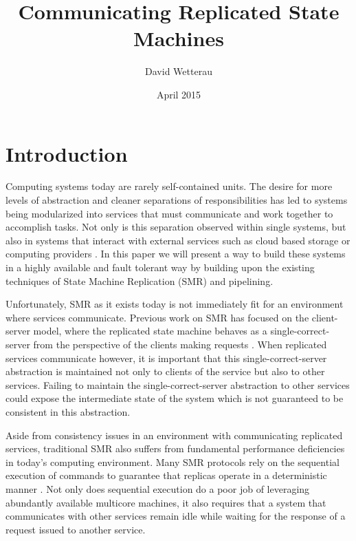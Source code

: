 \documentclass[11pt, oneside]{report}
\title{Communicating Replicated State Machines}
\author{David Wetterau}
\date{April 2015}
\begin{document}
\maketitle

\tableofcontents

\chapter{Introduction}\label{Introduction}
Computing systems today are rarely self-contained units. 
The desire for more levels of abstraction and cleaner separations of responsibilities has led to systems being modularized into services that must communicate and work together to accomplish tasks. 
Not only is this separation observed within single systems, but also in systems that interact with external services such as cloud based storage or computing providers \cite{tao, spanner, dynamo}. 
In this paper we will present a way to build these systems in a highly available and fault tolerant way by building upon the existing techniques of State Machine Replication (SMR) \cite{practicalBFT, hq, zyz, paxos, paxosMadeSimple, schneider} and pipelining.

Unfortunately, SMR as it exists today is not immediately fit for an environment where services communicate. 
Previous work on SMR has focused on the client-server model, where the replicated state machine behaves as a single-correct-server from the perspective of the clients making requests \cite{schneider}.
When replicated services communicate however, it is important that this single-correct-server abstraction is maintained not only to clients of the service but also to other services. 
Failing to maintain the single-correct-server abstraction to other services could expose the intermediate state of the system which is not guaranteed to be consistent in this abstraction.


Aside from consistency issues in an environment with communicating replicated services, traditional SMR also suffers from fundamental performance deficiencies in today's computing environment. 
Many SMR protocols rely on the sequential execution of commands to guarantee that replicas operate in a deterministic manner \cite{practicalBFT, upRight, hq, paxos}. 
Not only does sequential execution do a poor job of leveraging abundantly available multicore machines, it also requires that a system that communicates with other services remain idle while waiting for the response of a request issued to another service.
\end{document}
